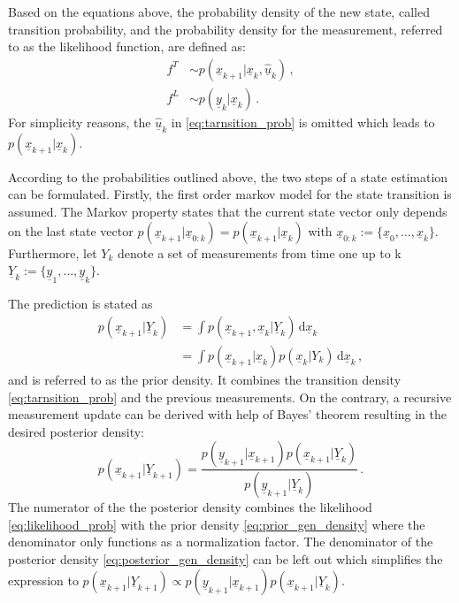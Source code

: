 \documentclass[a4paper]{IEEEtran}
\begin{document}
Based on the equations above, the probability density of the new state, called transition probability, and the probability density for the measurement, referred to as the likelihood function, are defined as:
\begin{align}
    f^{T} &\sim p(\underline{x}_{k+1} \vert \underline{x}_{k}, \underline{\hat{u}}_{k}) \,, \label{eq:tarnsition_prob} \\
    f^{L} &\sim p(\underline{y}_{k} \vert \underline{x}_{k}) \,. \label{eq:likelihood_prob}
\end{align}
For simplicity reasons, the $\underline{\hat{u}}_{k}$ in \eqref{eq:tarnsition_prob} is omitted which leads to $p(\underline{x}_{k+1} \vert \underline{x}_{k})$.

According to the probabilities outlined above, the two steps of a state estimation can be formulated. 
Firstly, the first order markov model for the state transition is assumed. The Markov property states that the current state vector only depends on the last state vector 
$p(\underline{x}_{k+1} \vert \underline{x}_{0:k}) = p(\underline{x}_{k+1} \vert \underline{x}_{k})$ with $\underline{x}_{0:k} := \{\underline{x}_{0}, \dotsc, \underline{x}_{k}\}$.
Furthermore, let $Y_{k}$ denote a set of measurements from time one up to k $\underline{Y}_{k} := \{\underline{y}_{1}, \dotsc , \underline{y}_{k}\}$.

The prediction is stated as
\begin{equation}
    \begin{split}
        p(\underline{x}_{k+1} \vert \underline{Y}_{k}) &= \int p(\underline{x}_{k+1}, \underline{x}_{k} \vert \underline{Y}_{k}) \, \mathrm{d} \underline{x}_{k} \\
        &= \int p(\underline{x}_{k+1} \vert \underline{x}_{k})p(\underline{x}_{k} \vert Y_{k})\, \mathrm{d} \underline{x}_{k} \,,
    \end{split}
    \label{eq:prior_gen_density}
\end{equation}
and is referred to as the prior density. It combines the transition density \eqref{eq:tarnsition_prob} and the previous measurements.
On the contrary, a recursive measurement update can be derived with help of Bayes' theorem resulting in the desired posterior density:
\begin{equation}
        p(\underline{x}_{k+1} \vert \underline{Y}_{k+1}) =
        \dfrac{p(\underline{y}_{k+1} \vert \underline{x}_{k+1}) p(\underline{x}_{k+1} \vert \underline{Y}_{k})}{p(\underline{y}_{k+1} \vert \underline{Y}_{k})} \,.  
        \label{eq:posterior_gen_density}
\end{equation}
The numerator of the the posterior density combines the likelihood \eqref{eq:likelihood_prob} with the 
prior density \eqref{eq:prior_gen_density} where the denominator only functions as a normalization factor.
The denominator of the posterior density \eqref{eq:posterior_gen_density} can be left out which simplifies the expression to 
$ p(\underline{x}_{k+1} \vert \underline{Y}_{k+1}) \propto p(\underline{y}_{k+1} \vert \underline{x}_{k+1}) p(\underline{x}_{k+1} \vert \underline{Y}_{k})$.
\end{document}
